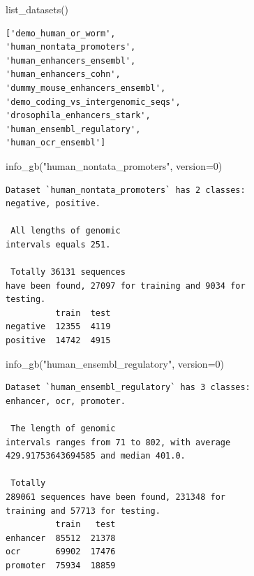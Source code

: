\documentclass[
  letterpaper,
]{article}
\newenvironment{Shaded}{\begin{snugshade}}{\end{snugshade}}
\newcommand{\DecValTok}[1]{\textcolor[rgb]{0.68,0.00,0.00}{#1}}
\newcommand{\NormalTok}[1]{\textcolor[rgb]{0.00,0.23,0.31}{#1}}
\newcommand{\OperatorTok}[1]{\textcolor[rgb]{0.37,0.37,0.37}{#1}}
\newcommand{\StringTok}[1]{\textcolor[rgb]{0.13,0.47,0.30}{#1}}
\begin{document}
\vspace{0.5cm}

\begin{Shaded}
\begin{Highlighting}[]
\NormalTok{list\_datasets()}
\end{Highlighting}
\end{Shaded}

\begin{verbatim}
['demo_human_or_worm',
'human_nontata_promoters',
'human_enhancers_ensembl',
'human_enhancers_cohn',
'dummy_mouse_enhancers_ensembl',
'demo_coding_vs_intergenomic_seqs',
'drosophila_enhancers_stark',
'human_ensembl_regulatory',
'human_ocr_ensembl']
\end{verbatim}

\vspace{0.5cm}

\begin{Shaded}
\begin{Highlighting}[]
\NormalTok{info\_gb(}\StringTok{"human\_nontata\_promoters"}\NormalTok{, version}\OperatorTok{=}\DecValTok{0}\NormalTok{)}
\end{Highlighting}
\end{Shaded}

\begin{verbatim}
Dataset `human_nontata_promoters` has 2 classes:
negative, positive.

 All lengths of genomic
intervals equals 251.

 Totally 36131 sequences
have been found, 27097 for training and 9034 for
testing.
          train  test
negative  12355  4119
positive  14742  4915
\end{verbatim}

\vspace{0.5cm}

\begin{Shaded}
\begin{Highlighting}[]
\NormalTok{info\_gb(}\StringTok{"human\_ensembl\_regulatory"}\NormalTok{, version}\OperatorTok{=}\DecValTok{0}\NormalTok{)}
\end{Highlighting}
\end{Shaded}

\begin{verbatim}
Dataset `human_ensembl_regulatory` has 3 classes:
enhancer, ocr, promoter.

 The length of genomic
intervals ranges from 71 to 802, with average
429.91753643694585 and median 401.0.

 Totally
289061 sequences have been found, 231348 for
training and 57713 for testing.
          train   test
enhancer  85512  21378
ocr       69902  17476
promoter  75934  18859
\end{verbatim}
\end{document}
